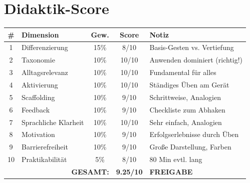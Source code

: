 \documentclass[11pt,a4paper]{article}
\begin{document}
\section{Didaktik-Score}

\begin{scorebox}
\begin{tabular}{|c|l|c|c|p{3.5cm}|}
\hline
\# & Dimension & Gew. & Score & Notiz \\
\hline
1 & Differenzierung & 15\% & 8/10 & Basis-Gesten vs. Vertiefung \\
2 & Taxonomie & 10\% & 10/10 & Anwenden dominiert (richtig!) \\
3 & Alltagsrelevanz & 10\% & 10/10 & Fundamental für alles \\
4 & Aktivierung & 10\% & 10/10 & Ständiges Üben am Gerät \\
5 & Scaffolding & 10\% & 9/10 & Schrittweise, Analogien \\
6 & Feedback & 10\% & 9/10 & Checkliste zum Abhaken \\
7 & Sprachliche Klarheit & 10\% & 10/10 & Sehr einfach, Analogien \\
8 & Motivation & 10\% & 9/10 & Erfolgserlebnisse durch Üben \\
9 & Barrierefreiheit & 10\% & 9/10 & Große Darstellung, Farben \\
10 & Praktikabilität & 5\% & 8/10 & 80 Min evtl. lang \\
\hline
\multicolumn{3}{|r|}{\textbf{GESAMT:}} & \textbf{9.25/10} & \textcolor{successgreen}{\textbf{FREIGABE}} \\
\hline
\end{tabular}
\end{scorebox}
\end{document}
